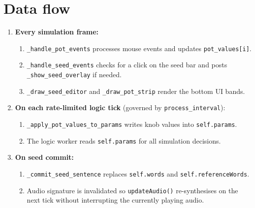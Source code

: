 \documentclass[11pt,a4paper]{report}
\begin{document}
\section{Data flow}

\begin{enumerate}
  \item \textbf{Every simulation frame:}
        \begin{enumerate}
          \item \texttt{\_handle\_pot\_events} processes mouse events and
                updates \texttt{pot\_values[i]}.
          \item \texttt{\_handle\_seed\_events} checks for a click on the
                seed bar and posts \texttt{\_show\_seed\_overlay} if needed.
          \item \texttt{\_draw\_seed\_editor} and \texttt{\_draw\_pot\_strip}
                render the bottom UI bands.
        \end{enumerate}
  \item \textbf{On each rate-limited logic tick} (governed by
        \texttt{process\_interval}):
        \begin{enumerate}
          \item \texttt{\_apply\_pot\_values\_to\_params} writes knob values
                into \texttt{self.params}.
          \item The logic worker reads \texttt{self.params} for all simulation
                decisions.
        \end{enumerate}
  \item \textbf{On seed commit:}
        \begin{enumerate}
          \item \texttt{\_commit\_seed\_sentence} replaces \texttt{self.words}
                and \texttt{self.referenceWords}.
          \item Audio signature is invalidated so \texttt{updateAudio()}
                re-synthesises on the next tick without interrupting the
                currently playing audio.
        \end{enumerate}
\end{enumerate}
\end{document}
